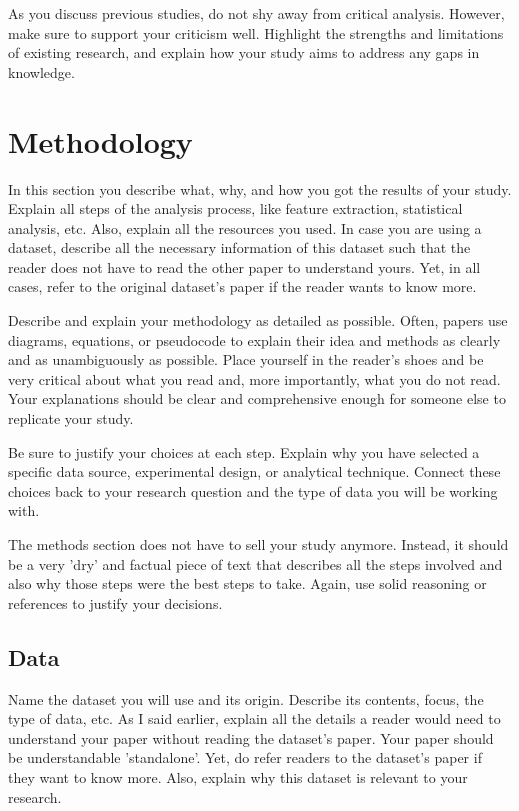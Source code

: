 \documentclass[10pt,a4paper]{article}
\begin{document}
As you discuss previous studies, do not shy away from critical analysis. However, make sure to support your criticism well. Highlight the strengths and limitations of existing research, and explain how your study aims to address any gaps in knowledge. 

\section{Methodology}\label{sec:methods}
In this section you describe what, why, and how you got the results of your study. Explain all steps of the analysis process, like feature extraction, statistical analysis, etc. Also, explain all the resources you used. In case you are using a dataset, describe all the necessary information of this dataset such that the reader does not have to read the other paper to understand yours. Yet, in all cases, refer to the original dataset's paper if the reader wants to know more. 

Describe and explain your methodology as detailed as possible. Often, papers use diagrams, equations, or pseudocode to explain their idea and methods as clearly and as unambiguously as possible. Place yourself in the reader's shoes and be very critical about what you read and, more importantly, what you do not read. Your explanations should be clear and comprehensive enough for someone else to replicate your study. 

Be sure to justify your choices at each step. Explain why you have selected a specific data source, experimental design, or analytical technique. Connect these choices back to your research question and the type of data you will be working with.

The methods section does not have to sell your study anymore. Instead, it should be a very 'dry' and factual piece of text that describes all the steps involved and also why those steps were the best steps to take. Again, use solid reasoning or references to justify your decisions.

\subsection{Data}
Name the dataset you will use and its origin. Describe its contents, focus, the type of data, etc. As I said earlier, explain all the details a reader would need to understand your paper without reading the dataset's paper. Your paper should be understandable 'standalone'. Yet, do refer readers to the dataset's paper if they want to know more. Also, explain why this dataset is relevant to your research. 
\end{document}
